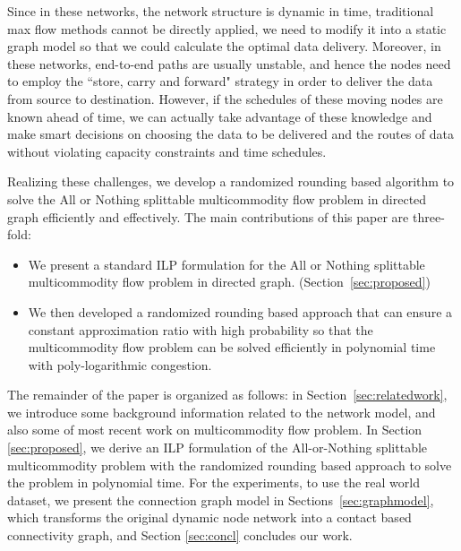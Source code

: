 \documentclass[conference]{IEEEtran}
\begin{document}
Since in these networks, the network structure is dynamic in time, traditional max flow methods cannot be directly applied, we need to modify it into a static graph model so that we could calculate the optimal data delivery. Moreover, in these networks, end-to-end paths are usually unstable, and hence the nodes need to employ the ``store, carry and forward" strategy in order to deliver the data from source to destination. However, if the schedules of these moving nodes are known ahead of time, we can actually take advantage of these knowledge and make smart decisions on choosing the data to be delivered and the routes of data without violating capacity constraints and time schedules.


Realizing these challenges, we develop a randomized rounding based algorithm to solve the All or Nothing splittable multicommodity flow problem in directed graph efficiently and effectively. The main contributions of this paper are three-fold:

\begin{itemize}

\item We present a standard ILP formulation for the All or Nothing splittable multicommodity flow problem in directed graph. (Section~\ref{sec:proposed})

\item We then developed a randomized rounding based approach that can ensure a constant  approximation ratio with high probability so that the multicommodity flow problem can be solved efficiently in polynomial time with poly-logarithmic congestion.


\end{itemize}

The remainder of the paper is organized as follows: in Section~\ref{sec:relatedwork}, we introduce some background information related to the network model, and also some of most recent work on multicommodity flow problem. In Section \ref{sec:proposed}, we derive an ILP formulation of the All-or-Nothing splittable multicommodity problem with the randomized rounding based approach to solve the problem in polynomial time. For the experiments, to use the real world dataset, we present the connection graph model in Sections~\ref{sec:graphmodel}, which transforms the original dynamic node network into a contact based connectivity graph, and Section \ref{sec:concl} concludes our work.
\end{document}
